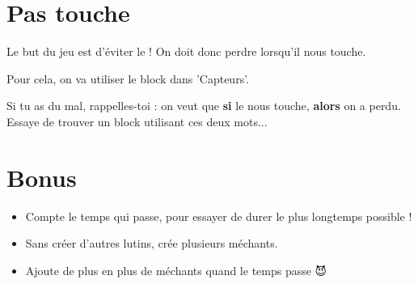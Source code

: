 \documentclass[a4paper,11pt]{article}
\begin{document}
\section{Pas touche}

Le but du jeu est d'éviter le  ! On doit donc perdre lorsqu'il nous touche.

Pour cela, on va utiliser le block  dans 'Capteurs'.

\begin{attention}
	Si tu as du mal, rappelles-toi : on veut que \textbf{si} le  nous touche, \textbf{alors} on a perdu. Essaye de trouver un block utilisant ces deux mots...
\end{attention}

\section*{Bonus}

\begin{itemize}
	\item Compte le temps qui passe, pour essayer de durer le plus longtemps possible !
	\item Sans créer d'autres lutins, crée plusieurs méchants.
	\item Ajoute de plus en plus de méchants quand le temps passe 😈
\end{itemize}
\end{document}
